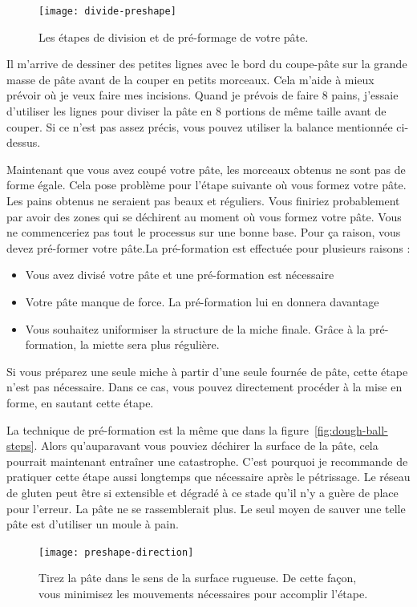 \begin{figure}[!htb]
  \texttt{[image: divide-preshape]}
  \caption{Les étapes de division et de pré-formage de votre pâte.}
\end{figure}

Il m'arrive de dessiner des petites lignes avec le bord du coupe-pâte
sur la grande masse de pâte avant de la couper en petits morceaux.
Cela m'aide à mieux prévoir où je veux faire mes incisions. Quand
je prévois de faire 8 pains, j'essaie d'utiliser les lignes pour diviser la pâte
en 8 portions de même taille avant de couper. Si ce n'est pas assez précis,
vous pouvez utiliser la balance mentionnée ci-dessus.

Maintenant que vous avez coupé votre pâte, les morceaux obtenus ne sont pas de forme égale.
Cela pose problème pour l'étape suivante où vous formez votre pâte.
Les pains obtenus ne seraient pas beaux et réguliers. Vous finiriez probablement
par avoir des zones qui se déchirent au moment où vous formez votre pâte.
Vous ne commenceriez pas tout le processus sur une bonne base. Pour ça
raison, vous devez pré-former votre pâte.La pré-formation est effectuée pour plusieurs raisons :
\begin{itemize}
  \item Vous avez divisé votre pâte et une pré-formation est nécessaire
  \item Votre pâte manque de force. La pré-formation lui en donnera davantage
  \item Vous souhaitez uniformiser la structure de la miche finale. Grâce à la pré-formation,
  la miette sera plus régulière.
\end{itemize}

Si vous préparez une seule miche à partir d'une seule fournée de pâte, cette étape n'est pas nécessaire.
Dans ce cas, vous pouvez directement procéder à la mise en forme, en sautant cette étape.

La technique de pré-formation est la même que dans la figure~\ref{fig:dough-ball-steps}.
Alors qu'auparavant vous pouviez déchirer la surface de la pâte, cela pourrait maintenant entraîner une catastrophe.
C'est pourquoi je recommande de pratiquer cette étape aussi longtemps que nécessaire après le pétrissage.
Le réseau de gluten peut être si extensible et dégradé à ce stade qu'il
n'y a guère de place pour l'erreur. La pâte ne se rassemblerait plus. Le seul
moyen de sauver une telle pâte est d'utiliser un moule à pain.

\begin{figure}[!htb]
  \texttt{[image: preshape-direction]}
  \caption[Sens de traction]{Tirez la pâte dans le sens de la surface rugueuse.
      De cette façon, vous minimisez les mouvements nécessaires pour accomplir
      l'étape.}%
  \label{fig:preshape-direction}
\end{figure}

